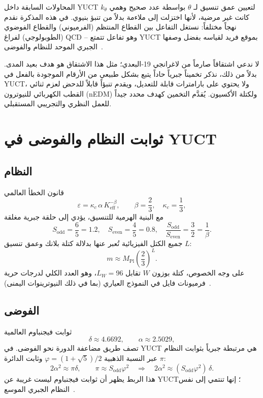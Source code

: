 \documentclass[12pt,a4paper]{article}
\begin{document}
	المحاولات السابقة داخل YUCT لتعيين عمق تنسيق لـ \(\theta\) بواسطة عدد صحيح وهمي \(k_\theta\) كانت غير مرضية، لأنها اختزلت إلى ملاءمة بدلاً من تنبؤ بنيوي. في هذه المذكرة نقدم نهجاً مختلفاً: نستغل التفاعل بين القطاع المنتظم (الفرميوني) والقطاع الفوضوي (الطوبولوجي) لفراغ QCD – وهو تفاعل تتمتع YUCT بموقع فريد لقياسه بفضل وصفها الجبري الموحد للنظام والفوضى~\cite{Y2,Feig}.
	
	لا ندعي اشتقاقاً صارماً من لاغرانجي 19‑البعدي؛ مثل هذا الاشتقاق هو هدف بعيد المدى. بدلاً من ذلك، نذكر تخميناً جبرياً حاداً يتبع بشكل طبيعي من الأرقام الموجودة بالفعل في YUCT، ولا يحتوي على بارامترات قابلة للتعديل، ويقدم تنبؤاً قابلاً للدحض لعزم ثنائي القطب الكهربائي للنيوترون (nEDM) ولكتلة الأكسيون. يُقدَّم التخمين كهدف محدد جيداً للعمل النظري والتجريبي المستقبلي.
	
	\section{ثوابت النظام والفوضى في YUCT}
	\label{sec:oc}
	
	\subsection{النظام}
	قانون الخطأ العالمي
	\[
	\varepsilon = \kappa_c\,\alpha\,K_{\mathrm{eff}}^{-\beta},\qquad \beta = \frac{2}{3},\quad \kappa_c = \frac{1}{3},
	\]
	مع البنية الهرمية للتنسيق، يؤدي إلى حلقة جبرية مغلقة
	\[
	S_{\mathrm{odd}} = \frac{6}{5} = 1.2,\quad S_{\mathrm{even}} = \frac{4}{5} = 0.8,\quad 
	\frac{S_{\mathrm{odd}}}{S_{\mathrm{even}}} = \frac{3}{2} = \frac{1}{\beta}.
	\]
	جميع الكتل الفيزيائية تُعبر عنها بدلالة كتلة بلانك وعمق تنسيق \(L\):
	\[
	m \approx M_{\mathrm{Pl}}\left(\frac{2}{3}\right)^L.
	\]
	على وجه الخصوص، كتلة بوزون \(W\) تقابل \(L_W = 96\)، وهو العدد الكلي لدرجات حرية فرميونات فايل في النموذج العياري (بما في ذلك النيوترينوات اليمنى)~\cite{Y3}.
	
	\subsection{الفوضى}
	ثوابت فيجنباوم العالمية
	\[
	\delta \approx 4.6692,\qquad \alpha \approx 2.5029,
	\]
	تصف طريق مضاعفة الدورة نحو الفوضى. في YUCT هي مرتبطة جبرياً بثوابت النظام عبر النسبة الذهبية \(\varphi = (1+\sqrt{5})/2\) وثابت الدائرة \(\pi\):
	\[
	2\alpha^2 \approx \pi\delta,\qquad
	\pi \approx S_{\mathrm{odd}}\varphi^2 \quad \Longrightarrow \quad 
	2\alpha^2 \approx (S_{\mathrm{odd}}\varphi^2)\,\delta .
	\]
	هذا الربط يظهر أن ثوابت فيجنباوم ليست غريبة عن YUCT؛ إنها تنتمي إلى نفس النظام الجبري الموسع~\cite{Y2}.
	
\end{document}
